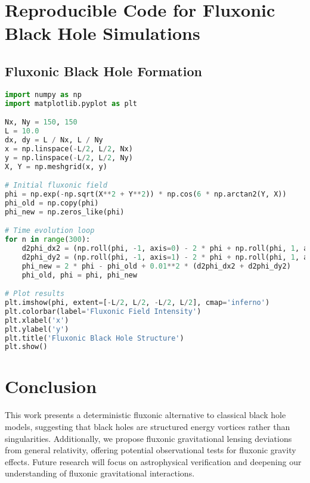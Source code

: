 \documentclass{article}
\begin{document}
\section{Reproducible Code for Fluxonic Black Hole Simulations}
\subsection{Fluxonic Black Hole Formation}
\begin{lstlisting}[language=Python]
import numpy as np
import matplotlib.pyplot as plt

Nx, Ny = 150, 150
L = 10.0
dx, dy = L / Nx, L / Ny
x = np.linspace(-L/2, L/2, Nx)
y = np.linspace(-L/2, L/2, Ny)
X, Y = np.meshgrid(x, y)

# Initial fluxonic field
phi = np.exp(-np.sqrt(X**2 + Y**2)) * np.cos(6 * np.arctan2(Y, X))
phi_old = np.copy(phi)
phi_new = np.zeros_like(phi)

# Time evolution loop
for n in range(300):
    d2phi_dx2 = (np.roll(phi, -1, axis=0) - 2 * phi + np.roll(phi, 1, axis=0)) / dx**2
    d2phi_dy2 = (np.roll(phi, -1, axis=1) - 2 * phi + np.roll(phi, 1, axis=1)) / dy**2
    phi_new = 2 * phi - phi_old + 0.01**2 * (d2phi_dx2 + d2phi_dy2)
    phi_old, phi = phi, phi_new

# Plot results
plt.imshow(phi, extent=[-L/2, L/2, -L/2, L/2], cmap='inferno')
plt.colorbar(label='Fluxonic Field Intensity')
plt.xlabel('x')
plt.ylabel('y')
plt.title('Fluxonic Black Hole Structure')
plt.show()
\end{lstlisting}

\section{Conclusion}
This work presents a deterministic fluxonic alternative to classical black hole models, suggesting that black holes are structured energy vortices rather than singularities. Additionally, we propose fluxonic gravitational lensing deviations from general relativity, offering potential observational tests for fluxonic gravity effects. Future research will focus on astrophysical verification and deepening our understanding of fluxonic gravitational interactions.
\end{document}
